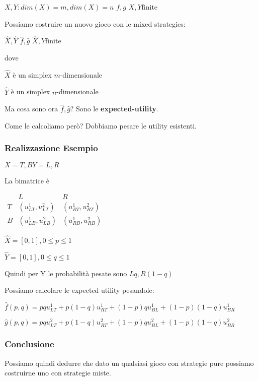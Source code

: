 \documentclass[10pt,a4paper]{report}
\begin{document}
        $X,Y: dim(X)=m, dim(X)=n$  $f,g$  $X,Y \text{finite}$

        Possiamo costruire un nuovo gioco con le mixed strategies:

        $\hat{X}, \hat{Y}$  $\hat{f}, \hat{g}$ $\hat{X}, \hat{Y} \text{finite}$

        dove 
        
        $\hat{X}$ è un simplex $m$-dimensionale

        $\hat{Y}$ è un simplex $n$-dimensionale

        Ma cosa sono ora $\hat{f}, \hat{g}$? Sono le \textbf{expected-utility}. 
        
        Come le calcoliamo però? Dobbiamo pesare le utility esistenti.

        \subsubsection{Realizzazione Esempio}
        $X={T,B} Y={L,R}$

        La bimatrice è
        \begin{center} 
            $
            \begin{matrix}
                & L & R \\
                T & (u_{LT}^1,u_{LT}^2) & (u_{RT}^1,u_{RT}^2) \\
                B & (u_{LB}^1,u_{LB}^2) & (u_{RB}^1,u_{RB}^2)
            \end{matrix}
            $
        \end{center}

        $\hat{X}=[0,1], 0 \le p \le 1$
        
        $\hat{Y}=[0,1], 0 \le q \le 1$

        Quindi per Y le probabilità pesate sono $Lq, R(1-q)$

        Possiamo calcolare le expected utility pesandole:
        
        $\hat{f}(p,q)= pqu_{LT}^1 + p(1-q)u_{RT}^1 + (1-p)qu_{BL}^1 + (1-p)(1-q)u_{BR}^1$
        
        $\hat{g}(p,q)= pqu_{LT}^2 + p(1-q)u_{RT}^2 + (1-p)qu_{BL}^2 + (1-p)(1-q)u_{BR}^2$

        \subsubsection{Conclusione}

        Possiamo quindi dedurre che dato un qualsiasi gioco con strategie pure possiamo costruirne uno con strategie miste.
        
\end{document}
